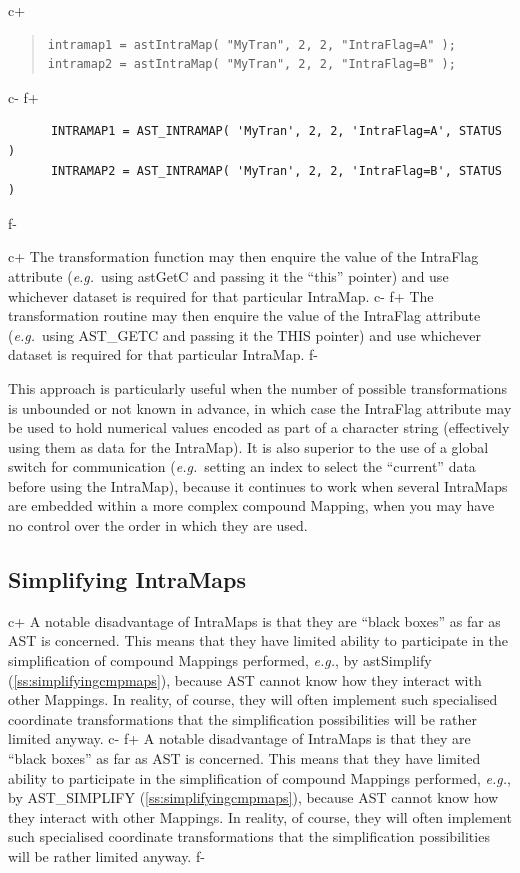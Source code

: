 \documentclass[twoside,11pt]{article}
\newcommand{\xlabel}[1]{}
\newcommand{\secref}[1]{\S\ref{#1}}
\renewcommand{\secref}[1]{\ref{#1}}
\begin{document}
c+
\begin{quote}
\small
\begin{verbatim}
intramap1 = astIntraMap( "MyTran", 2, 2, "IntraFlag=A" );
intramap2 = astIntraMap( "MyTran", 2, 2, "IntraFlag=B" );
\end{verbatim}
\normalsize
\end{quote}
c-
f+
\small
\begin{verbatim}
      INTRAMAP1 = AST_INTRAMAP( 'MyTran', 2, 2, 'IntraFlag=A', STATUS )
      INTRAMAP2 = AST_INTRAMAP( 'MyTran', 2, 2, 'IntraFlag=B', STATUS )
\end{verbatim}
\normalsize
f-

c+
The transformation function may then enquire the value of the IntraFlag
attribute ({\em{e.g.}}\ using astGetC and passing it the ``this''
pointer) and use whichever dataset is required for that particular
IntraMap.
c-
f+
The transformation routine may then enquire the value of the IntraFlag
attribute ({\em{e.g.}}\ using AST\_GETC and passing it the THIS
pointer) and use whichever dataset is required for that particular
IntraMap.
f-

This approach is particularly useful when the number of possible
transformations is unbounded or not known in advance, in which case
the IntraFlag attribute may be used to hold numerical values encoded
as part of a character string (effectively using them as data for the
IntraMap). It is also superior to the use of a global switch for
communication ({\em{e.g.}}\ setting an index to select the ``current''
data before using the IntraMap), because it continues to work when
several IntraMaps are embedded within a more complex compound Mapping,
when you may have no control over the order in which they are used.

\subsection{\xlabel{MaxTran}\label{ss:simplifyingintramaps}Simplifying IntraMaps}

c+
A notable disadvantage of IntraMaps is that they are ``black boxes''
as far as AST is concerned. This means that they have limited ability
to participate in the simplification of compound Mappings performed,
{\em{e.g.}}, by astSimplify (\secref{ss:simplifyingcmpmaps}), because
AST cannot know how they interact with other Mappings. In reality, of
course, they will often implement such specialised coordinate
transformations that the simplification possibilities will be rather
limited anyway.
c-
f+
A notable disadvantage of IntraMaps is that they are ``black boxes''
as far as AST is concerned. This means that they have limited ability
to participate in the simplification of compound Mappings performed,
{\em{e.g.}}, by AST\_SIMPLIFY (\secref{ss:simplifyingcmpmaps}),
because AST cannot know how they interact with other Mappings. In
reality, of course, they will often implement such specialised
coordinate transformations that the simplification possibilities will
be rather limited anyway.
f-
\end{document}
